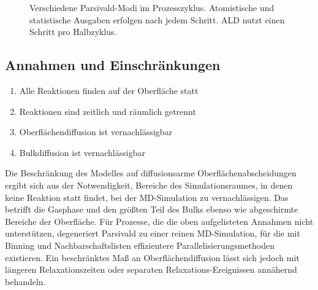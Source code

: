 \begin{figure}
  \captionsetup[subfigure]{singlelinecheck=false}
  \begin{subfigure}[t]{5.7cm}
    \def\svgwidth{\textwidth}
    
  \end{subfigure}
  \hfill
  \begin{subfigure}[t]{4.7cm}
    \def\svgwidth{\textwidth}
    
  \end{subfigure}
  \hfill
  \begin{subfigure}[t]{3cm}
    \def\svgwidth{\textwidth}
    
  \end{subfigure}
  \caption[Parsivald-Modi]{
    Verschiedene Parsivald-Modi im Prozesszyklus.
    Atomistische und statistische Ausgaben erfolgen nach jedem Schritt.
    ALD nutzt einen Schritt pro Halbzyklus.
  }
  \label{fig:parsivald-modes}
\end{figure}

\subsection{Annahmen und Einschränkungen}

\begin{enumerate}
\item Alle Reaktionen finden auf der Oberfläche statt
\item Reaktionen sind zeitlich und räumlich getrennt
\item Oberflächendiffusion ist vernachlässigbar
\item Bulkdiffusion ist vernachlässigbar
\end{enumerate}

Die Beschränkung des Modelles auf diffusionsarme Oberflächenabscheidungen ergibt sich aus der Notwendigkeit, Bereiche des Simulationsraumes, in denen keine Reaktion statt findet, bei der MD-Simulation zu vernachlässigen.
Das betrifft die Gasphase und den größten Teil des Bulks ebenso wie abgeschirmte Bereiche der Oberfläche.
Für Prozesse, die die oben aufgelisteten Annahmen nicht unterstützen, degeneriert Parsivald zu einer reinen MD-Simulation, für die mit Binning und Nachbarschaftslisten effizientere Parallelisierungsmethoden existieren.
Ein beschränktes Maß an Oberflächendiffusion lässt sich jedoch mit  längeren Relaxationszeiten oder separaten Relaxations-Ereignissen annähernd behandeln.


